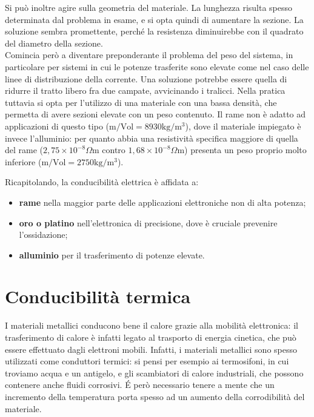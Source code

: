 Si può inoltre agire sulla geometria del materiale. La lunghezza risulta spesso determinata dal problema in esame, e si opta quindi di aumentare la sezione. La soluzione sembra promettente, perché la resistenza diminuirebbe con il quadrato del diametro della sezione.\\
Comincia però a diventare preponderante il problema del peso del sistema, in particolare per sistemi in cui le potenze trasferite sono elevate come nel caso delle linee di distribuzione della corrente. Una soluzione potrebbe essere quella di ridurre il tratto libero fra due campate, avvicinando i tralicci. Nella pratica tuttavia si opta per l'utilizzo di una materiale con una bassa densità, che permetta di avere sezioni elevate con un peso contenuto. Il rame non è adatto ad applicazioni di questo tipo ($\mathrm{m/Vol} = 8930 \mathrm{kg/m^3}$), dove il materiale impiegato è invece l'alluminio: per quanto abbia una resistività specifica maggiore di quella del rame ($2,75 \times 10^{-8}\Omega\mathrm{m}$ contro $1,68\times 10^{-8}\Omega\mathrm{m}$) presenta un peso proprio molto inferiore ($\mathrm{m/Vol} = 2750 \mathrm{kg/m^3}$).

Ricapitolando, la conducibilità elettrica è affidata a:
\begin{itemize}
    \item \textbf{rame} nella maggior parte delle applicazioni elettroniche non di alta potenza;
    \item \textbf{oro o platino} nell'elettronica di precisione, dove è cruciale prevenire l'ossidazione;
    \item \textbf{alluminio} per il trasferimento di potenze elevate.
\end{itemize}

\section{Conducibilità termica} 

I materiali metallici conducono bene il calore grazie alla mobilità elettronica: il trasferimento di calore è infatti legato al trasporto di energia cinetica, che può essere effettuato dagli elettroni mobili. Infatti, i materiali metallici sono spesso utilizzati come conduttori termici: si pensi per esempio ai termosifoni, in cui troviamo acqua e un antigelo, e gli scambiatori di calore industriali, che possono contenere anche fluidi corrosivi. É però necessario tenere a mente che un incremento della temperatura porta spesso ad un aumento della corrodibilità del materiale.

